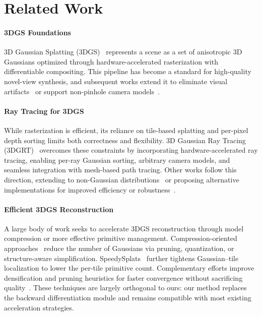 \section{Related Work}

\paragraph{3DGS Foundations}
3D Gaussian Splatting (3DGS)~\cite{kerbl20233d} represents a scene as a set of anisotropic 3D Gaussians optimized through hardware-accelerated rasterization with differentiable compositing. This pipeline has become a standard for high-quality novel-view synthesis, and subsequent works extend it to eliminate visual artifacts~\cite{radl2024stopthepop, kv2025stochasticsplats} or support non-pinhole camera models~\cite{wu20253dgut}.

\paragraph{Ray Tracing for 3DGS}
While rasterization is efficient, its reliance on tile-based splatting and per-pixel depth sorting limits both correctness and flexibility. 3D Gaussian Ray Tracing (3DGRT)~\cite{loccoz20243dgrt} overcomes these constraints by incorporating hardware-accelerated ray tracing, enabling per-ray Gaussian sorting, arbitrary camera models, and seamless integration with mesh-based path tracing. Other works follow this direction, extending to non-Gaussian distributions~\cite{dontsplatyourgaussian} or proposing alternative implementations for improved efficiency or robustness~\cite{mai2024everexactvolumetricellipsoid, RaySplats}.

\paragraph{Efficient 3DGS Reconstruction}
A large body of work seeks to accelerate 3DGS reconstruction through model compression or more effective primitive management. Compression-oriented approaches~\cite{Fang2024MiniSplattingRS, HansonSpeedy, chen2025hac100xcompression3d} reduce the number of Gaussians via pruning, quantization, or structure-aware simplification. SpeedySplats~\cite{HansonSpeedy} further tightens Gaussian--tile localization to lower the per-tile primitive count. Complementary efforts improve densification and pruning heuristics for faster convergence without sacrificing quality~\cite{3DGSMCMC, Taming3DGS}. These techniques are largely orthogonal to ours: our method replaces the backward differentiation module and remains compatible with most existing acceleration strategies.

